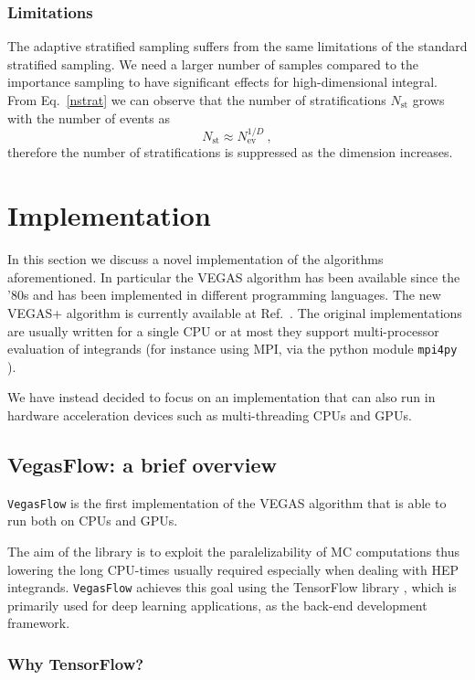 \documentclass[../main/main.tex]{subfiles}
\begin{document}
\subsubsection{Limitations}
The adaptive stratified sampling suffers from the same limitations of the standard stratified sampling.
We need a larger number of samples compared to the importance sampling  to have significant effects for high-dimensional integral.
From Eq.~\ref{nstrat} we can observe that the number of stratifications $N_\text{st}$ grows with the number of events as 
\begin{equation}
	N_\text{st} \approx N_\text{ev}^{1/D} \ ,
\end{equation}
therefore the number of stratifications is suppressed as the dimension increases. 

\section{Implementation}
In this section we discuss a novel implementation of the algorithms aforementioned.
In particular the VEGAS algorithm has been available since the '80s and has been implemented in different programming languages.
The new VEGAS+ algorithm is currently available at Ref.~\cite{peter_lepage_2021_4746454}.
The original implementations are usually written for a single CPU or at most they support multi-processor evaluation of integrands (for instance using
MPI, via the python module \texttt{mpi4py} \cite{peter_lepage_2021_4746454}).

We have instead decided to focus on an implementation that can also run in hardware acceleration devices such as multi-threading CPUs and GPUs.

\subsection{VegasFlow: a brief overview}
\texttt{VegasFlow} \cite{vegasflow_package} is the first implementation of the VEGAS algorithm that is able to run both on CPUs and GPUs.
 
The aim of the library is to exploit the paralelizability of MC computations thus lowering the long CPU-times usually required especially when
dealing with HEP integrands.
 \texttt{VegasFlow} achieves this goal using the TensorFlow library \cite{tensorflow2015-whitepaper}, which is primarily used for deep learning applications, as the back-end development framework. 

\subsubsection{Why TensorFlow?}
\label{tensorflow}
\end{document}
